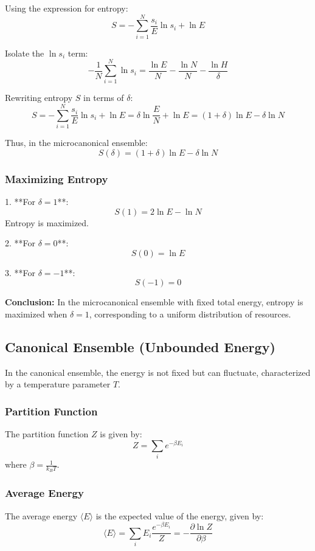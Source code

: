 \documentclass{article}
\begin{document}
Using the expression for entropy:
\[
S = -\sum_{i=1}^N \frac{s_i}{E} \ln s_i + \ln E
\]

Isolate the \(\ln s_i\) term:
\[
-\frac{1}{N} \sum_{i=1}^N \ln s_i = \frac{\ln E}{N} - \frac{\ln N}{N} - \frac{\ln H}{\delta}
\]

Rewriting entropy \(S\) in terms of \(\delta\):
\[
S = -\sum_{i=1}^N \frac{s_i}{E} \ln s_i + \ln E = \delta \ln \frac{E}{N} + \ln E = (1 + \delta) \ln E - \delta \ln N
\]

Thus, in the microcanonical ensemble:
\[
S(\delta) = (1 + \delta) \ln E - \delta \ln N
\]

\subsubsection{Maximizing Entropy}

1. **For \(\delta = 1\)**:
   \[
   S(1) = 2 \ln E - \ln N
   \]
   Entropy is maximized.

2. **For \(\delta = 0\)**:
   \[
   S(0) = \ln E
   \]

3. **For \(\delta = -1\)**:
   \[
   S(-1) = 0
   \]

\textbf{Conclusion:} In the microcanonical ensemble with fixed total energy, entropy is maximized when \(\delta = 1\), corresponding to a uniform distribution of resources.

\subsection{Canonical Ensemble (Unbounded Energy)}

In the canonical ensemble, the energy is not fixed but can fluctuate, characterized by a temperature parameter \(T\).

\subsubsection{Partition Function}

The partition function \(Z\) is given by:
\[
Z = \sum_i e^{-\beta E_i}
\]
where \(\beta = \frac{1}{k_B T}\).

\subsubsection{Average Energy}

The average energy \(\langle E \rangle\) is the expected value of the energy, given by:
\[
\langle E \rangle = \sum_i E_i \frac{e^{-\beta E_i}}{Z} = -\frac{\partial \ln Z}{\partial \beta}
\]
\end{document}
